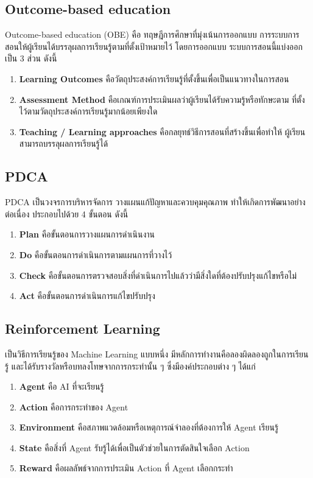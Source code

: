 \documentclass[12pt,oneside,openright,a4paper]{cpe-thai-project}
\begin{document}
\subsection{Outcome-based education\cite{obe}}
Outcome-based education (OBE) คือ ทฤษฎีการศึกษาที่มุ่งเน้นการออกแบบ
การระบบการสอนให้ผู้เรียนได้บรรลุผลการเรียนรู้ตามที่ตั้งเป้าหมายไว้ โดยการออกแบบ
ระบบการสอนนี้แบ่งออกเป็น 3 ส่วน ดังนี้
\begin{enumerate}
  \item \textbf{Learning Outcomes} คือวัตถุประสงค์การเรียนรู้ที่ตั้งขึ้นเพื่อเป็นแนวทางในการสอน
  \item \textbf{Assessment Method} คือเกณฑ์การประเมินผลว่าผู้เรียนได้รับความรู้หรือทักษะตาม
  ที่ตั้งไว้ตามวัตถุประสงค์การเรียนรู้มากน้อยเพียงใด
  \item \textbf{Teaching / Learning approaches} คือกลยุทธ์วิธีการสอนที่สร้างขึ้นเพื่อทำให้
  ผู้เรียนสามารถบรรลุผลการเรียนรู้ได้
\end{enumerate}


\subsection{PDCA\cite{pdca10}}
PDCA เป็นวงจรการบริหารจัดการ วางแผนแก้ปัญหาและควบคุมคุณภาพ ทำให้เกิดการพัฒนาอย่างต่อเนื่อง ประกอบไปด้วย 4 ขั้นตอน ดังนี้
\begin{enumerate}
  \item \textbf{Plan} คือขั้นตอนการวางแผนการดำเนินงาน
  \item \textbf{Do} คือขั้นตอนการดำเนินการตามแผนการที่วางไว้
  \item \textbf{Check} คือขั้นตอนการตรวจสอบสิ่งที่ดำเนินการไปแล้วว่ามีสิ่งใดที่ต้องปรับปรุงแก้ไขหรือไม่
  \item \textbf{Act} คือขั้นตอนการดำเนินการแก้ไขปรับปรุง
\end{enumerate}


\pagebreak
\subsection{Reinforcement Learning\cite{rl18}}
เป็นวิธีการเรียนรู้ของ Machine Learning แบบหนึ่ง 
มีหลักการทำงานคือลองผิดลองถูกในการเรียนรู้ และได้รับรางวัลหรือบทลงโทษจากการกระทำนั้น ๆ 
ซึ่งมีองค์ประกอบต่าง ๆ ได้แก่
\begin{enumerate}
  \item \textbf{Agent} คือ AI ที่จะเรียนรู้
  \item \textbf{Action} คือการกระทำของ Agent
  \item \textbf{Environment} คือสภาพแวดล้อมหรือเหตุการณ์จำลองที่ต้องการให้ Agent เรียนรู้
  \item \textbf{State} คือสิ่งที่ Agent รับรู้ได้เพื่อเป็นตัวช่วยในการตัดสินใจเลือก Action
  \item \textbf{Reward} คือผลลัพธ์จากการประเมิน Action ที่ Agent เลือกกระทำ
\end{enumerate}
\end{document}
